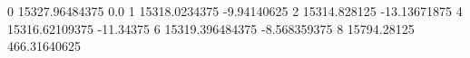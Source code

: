 0 15327.96484375 0.0
1 15318.0234375 -9.94140625
2 15314.828125 -13.13671875
4 15316.62109375 -11.34375
6 15319.396484375 -8.568359375
8 15794.28125 466.31640625
